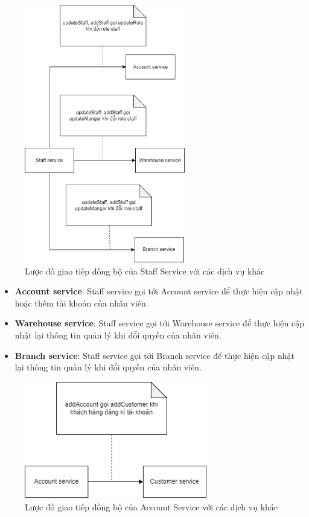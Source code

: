 \newpage
{}
\begin{figure}[!htp]
	\centering
	\includegraphics[width=7cm]{img/Architecture/service/staff-call.png}
	\newline
	\caption{Lược đồ giao tiếp đồng bộ của Staff Service với các dịch vụ khác}
\end{figure}

\begin{itemize}
	\item \textbf{Account service}: Staff service gọi tới Account service để thực hiện cập nhật hoặc thêm tài khoản của nhân viên.
	\item \textbf{Warehouse service}: Staff service gọi tới Warehouse service để thực hiện cập nhật lại thông tin quản lý khi đổi quyền của nhân viên.
	\item \textbf{Branch service}: Staff service gọi tới Branch service để thực hiện cập nhật lại thông tin quản lý khi đổi quyền của nhân viên.
\end{itemize}

\begin{figure}[!htp]
	\centering
	\includegraphics[width=8cm]{img/Architecture/service/account-call.png}
	\newline
	\caption{Lược đồ giao tiếp đồng bộ của Account Service với các dịch vụ khác}
\end{figure}

